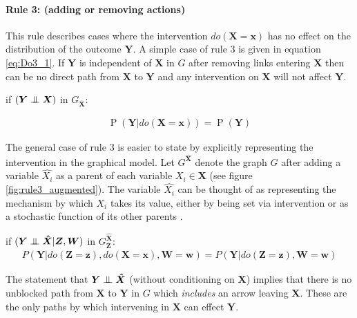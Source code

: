 \documentclass[11pt,a4paper,oneside]{book}
\newcommand{\eqn}[1]{\begin{align}#1\end{align}}
\renewcommand{\P}[1]{\operatorname{P}\left(#1\right)}
\theoremstyle{plain}
\theoremstyle{definition}
\newcommand{\ci}{\mathrel{\perp\mspace{-10mu}\perp}}
\begin{document}
\paragraph{Rule 3: (adding or removing actions)}
This rule describes cases where the intervention $do(\boldsymbol{X}=\boldsymbol{x})$ has no effect on the distribution of the outcome $\boldsymbol{Y}$. A simple case of rule 3 is given in equation \ref{eq:Do3_1}. If $\boldsymbol{Y}$ is independent of $\boldsymbol{{X}}$ in $G$ after removing links entering $\boldsymbol{X}$ then can be no direct path from $\boldsymbol{X}$ to $\boldsymbol{Y}$ and any intervention on $\boldsymbol{X}$ will not affect $\boldsymbol{Y}$.

if $(\boldsymbol{Y} \ci \boldsymbol{{X}})$ in $G_{\boldsymbol{\overline{X}}}$:

\eqn{
\label{eq:Do3_1}
\P{\boldsymbol{Y}|do(\boldsymbol{X}=\boldsymbol{x})} = \P{\boldsymbol{Y}}
}

The general case of rule 3 is easier to state by explicitly representing the intervention in the graphical model. Let $G^{\boldsymbol{\hat{X}}}$ denote the graph $G$ after adding a variable $\hat{X_i}$ as a parent of each variable $X_i \in \boldsymbol{X}$ (see figure \ref{fig:rule3_augmented}). The variable $\hat{X_i}$ can be thought of as representing the mechanism by which $X_i$ takes its value, either by being set via intervention or as a stochastic function of its other parents \citep{Koller2009}.


if $(\boldsymbol{Y} \ci \boldsymbol{\hat{X}} |\boldsymbol{Z},\boldsymbol{W})$ in $G^{\boldsymbol{\hat{X}}}_{\boldsymbol{\overline{Z}}}$:
\eqn{
\label{eq:Do3}
P(\boldsymbol{Y}|do(\boldsymbol{Z}=\boldsymbol{z}),do(\boldsymbol{X}=\boldsymbol{x}),\boldsymbol{W}=\boldsymbol{w}) = P(\boldsymbol{Y}|do(\boldsymbol{Z}=\boldsymbol{z}),\boldsymbol{W}=\boldsymbol{w})
}

The statement that $\boldsymbol{Y} \ci \boldsymbol{\hat{X}}$ (without conditioning on $\boldsymbol{X}$) implies that there is no unblocked path from $\boldsymbol{X}$ to $\boldsymbol{Y}$ in $G$ which \emph{includes} an arrow leaving $\boldsymbol{X}$. These are the only paths by which intervening in $\boldsymbol{X}$ can effect $\boldsymbol{Y}$.
\end{document}
